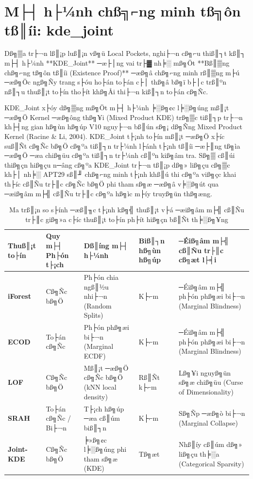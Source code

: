 ﻿\documentclass[../main.tex]{subfiles}
\begin{document}
\section{M├┤ h├¼nh chß╗⌐ng minh tß╗ôn tß║íi: kde\_joint}
\label{section:2.7}

Dß╗▒a tr├¬n lß║¡p luß║¡n vß╗ü Local Pockets, nghi├¬n cß╗⌐u thiß║┐t kß║┐ m├┤ h├¼nh **KDE\_Joint** ─æ├│ng vai tr├▓ nh╞░ mß╗Öt **Bß║▒ng chß╗⌐ng tß╗ôn tß║íi (Existence Proof)** ─æß╗â chß╗⌐ng minh rß║▒ng m├ú ─æß╗Öc ngß╗Ñy trang s├óu ho├án to├án c├│ thß╗â bß╗ï b├│c trß║ºn nß║┐u thuß║¡t to├ín tho├ít khß╗Åi thi├¬n kiß║┐n to├án cß╗Ñc.

KDE\_Joint x├óy dß╗▒ng mß╗Öt m├┤ h├¼nh ╞░ß╗¢c l╞░ß╗úng mß║¡t ─æß╗Ö Kernel ─æß╗ông thß╗¥i (Mixed Product KDE) trß╗▒c tiß║┐p tr├¬n kh├┤ng gian hß╗ùn hß╗úp V10 nguy├¬n bß║ún sß╗¡ dß╗Ñng Mixed Product Kernel (Racine \& Li, 2004). KDE\_Joint t├¡nh to├ín mß║¡t ─æß╗Ö x├íc suß║Ñt cß╗Ñc bß╗Ö cß╗ºa tiß║┐n tr├¼nh l├ánh t├¡nh tß║íi ─æ├║ng tß╗ìa ─æß╗Ö ─æa chiß╗üu cß╗ºa tiß║┐n tr├¼nh cß║ºn kiß╗âm tra. Sß╗▒ cß║úi thiß╗çn hiß╗çu n─âng cß╗ºa KDE\_Joint tr├¬n tß║¡p dß╗» liß╗çu cß╗▒c kh├│ nh╞░ APT29 sß║╜ chß╗⌐ng minh t├¡nh khß║ú thi cß╗ºa viß╗çc khai th├íc cß║Ñu tr├║c cß╗Ñc bß╗Ö phi tham sß╗æ ─æß╗â v╞░ß╗út qua ─æiß╗âm m├╣ cß║Ñu tr├║c cß╗ºa hß╗ìc m├íy truyß╗ün thß╗æng.

\begin{table}[H]
\centering
\small
\setlength{\tabcolsep}{4pt}
\caption{Ma trß║¡n so s├ính ─æß║╖c t├¡nh kß╗╣ thuß║¡t v├á ─æiß╗âm m├╣ cß║Ñu tr├║c giß╗»a c├íc thuß║¡t to├ín ph├ít hiß╗çn bß║Ñt th╞░ß╗¥ng}
\label{tab:algorithm_matrix}
\begin{tabular}{|p{1.8cm}|p{1.8cm}|p{3.4cm}|>{\centering\arraybackslash}p{1.2cm}|p{5.0cm}|}
\hline
\textbf{Thuß║¡t to├ín} & \textbf{Quy m├┤ Ph├ón t├¡ch} & \textbf{Dß║íng m├┤ h├¼nh} & \textbf{Biß║┐n hß╗ùn hß╗úp} & \textbf{─Éiß╗âm m├╣ cß║Ñu tr├║c cß╗æt l├╡i} \\ \hline
\textbf{iForest} & Cß╗Ñc bß╗Ö & Ph├ón chia ngß║½u nhi├¬n (Random Splits) & K├⌐m & ─Éiß╗âm m├╣ ph├ón phß╗æi bi├¬n (Marginal Blindness) \\ \hline
\textbf{ECOD} & To├án cß╗Ñc & Ph├ón phß╗æi bi├¬n (Marginal ECDF) & K├⌐m & ─Éiß╗âm m├╣ ph├ón phß╗æi bi├¬n (Marginal Blindness) \\ \hline
\textbf{LOF} & Cß╗Ñc bß╗Ö & Mß║¡t ─æß╗Ö cß╗Ñc bß╗Ö (kNN local density) & Rß║Ñt k├⌐m & Lß╗¥i nguyß╗ün sß╗æ chiß╗üu (Curse of Dimensionality) \\ \hline
\textbf{SRAH} & To├án cß╗Ñc / Bi├¬n & T├¡ch hß╗úp ─æa cß║úm biß║┐n & K├⌐m & Sß╗Ñp ─æß╗ò bi├¬n (Marginal Collapse) \\ \hline
\textbf{Joint-KDE} & Cß╗Ñc bß╗Ö & ╞»ß╗¢c l╞░ß╗úng phi tham sß╗æ (KDE) & Tß╗æt & Nhß║íy cß║úm dß╗» liß╗çu th╞░a (Categorical Sparsity) \\ \hline
\end{tabular}
\end{table}
\end{document}
